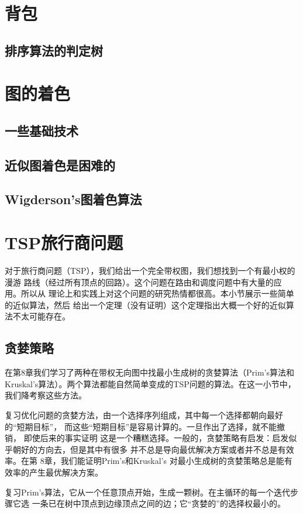 \section{背包}
\subsection{排序算法的判定树}
\section{图的着色}
\subsection{一些基础技术}
\subsection{近似图着色是困难的}
\subsection{Wigderson's图着色算法}

\section{TSP旅行商问题}
对于旅行商问题（TSP），我们给出一个完全带权图，我们想找到一个有最小权的漫游
路线（经过所有顶点的回路）。这个问题在路由和调度问题中有大量的应 用。所以从
理论上和实践上对这个问题的研究热情都很高。本小节展示一些简单的近似算法，然后
给出一个定理（没有证明）这个定理指出大概一个好的近似算法不太可能存在。
\subsection{贪婪策略}
在第8章我们学习了两种在带权无向图中找最小生成树的贪婪算法（Prim's算法和
Kruskal's算法）。两个算法都能自然简单变成的TSP问题的算法。在这一小节中，
我们降考察这些方法。

复习优化问题的贪婪方法，由一个选择序列组成，其中每一个选择都朝向最好的“短期目标”，
而这些“短期目标”是容易计算的。一旦作出了选择，就不能撤销， 即使后来的事实证明
这是一个糟糕选择。一般的，贪婪策略有启发：启发似乎朝好的方向去，但是其中有很多
并不总是导向最优解决方案或者并不总是有效率。在第 8章，我们能证明Prim's和Kruskal's
对最小生成树的贪婪策略总是能有效率的产生最优解决方案。

复习Prim's算法，它从一个任意顶点开始，生成一颗树。在主循环的每一个迭代步骤它选
一条已在树中顶点到边缘顶点之间的边；它“贪婪的”的选择权最小的。


